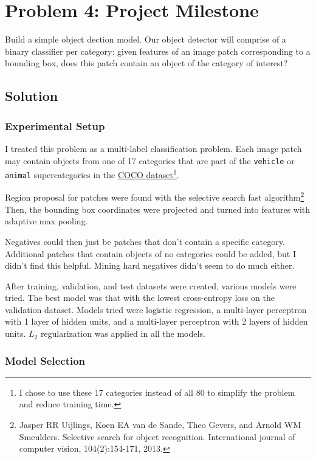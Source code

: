 \section*{Problem 4: Project Milestone}

Build a simple object dection model. Our object detector will comprise of a
binary classifier per category: given features of an image patch corresponding
to a bounding box, does this patch contain an object of the category of
interest?

\subsection*{Solution}

\subsubsection*{Experimental Setup}

I treated this problem as a multi-label classification problem. Each image patch
may contain objects from one of 17 categories that are part of the
\texttt{vehicle} or \texttt{animal} supercategories in the
\href{http://cocodataset.org/}{COCO dataset}\footnote{I chose to use these 17
  categories instead of all 80 to simplify the problem and reduce training
  time.}.

Region proposal for patches were found with the selective search fast
algorithm\footnote{Jasper RR Uijlings, Koen EA van de Sande, Theo Gevers, and
  Arnold WM Smeulders. Selective search for object recognition. International
  journal of computer vision, 104(2):154-171, 2013.} Then, the bounding box
coordinates were projected and turned into features with adaptive max pooling.

Negatives could then just be patches that don't contain a specific
category. Additional patches that contain objects of no categories could be
added, but I didn't find this helpful. Mining hard negatives didn't seem to do
much either.

After training, validation, and test datasets were created, various models were
tried. The best model was that with the lowest cross-entropy loss on the
validation dataset. Models tried were logistic regression, a multi-layer
perceptron with 1 layer of hidden units, and a multi-layer perceptron with 2
layers of hidden units. $L_2$ regularization was applied in all the models.

\subsubsection*{Model Selection}

